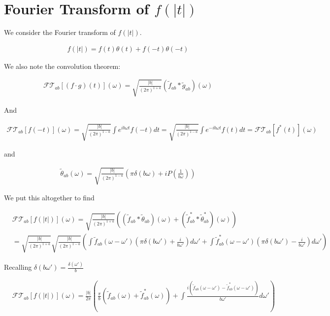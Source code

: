 \documentclass[12pt]{article}
\begin{document}
\section{Fourier Transform of $f(|t|)$}

We consider the Fourier transform of $f(|t|)$.

\begin{align}
f(|t|) = f(t)\theta(t) + f(-t)\theta(-t)
\end{align}

We also note the convolution theorem:

\begin{align}
\mathcal{FT}_{ab}[(f\cdot g)(t)](\omega) = \sqrt{\frac{|b|}{(2\pi)^{1+a}}} (\tilde{f}_{ab} \ast \tilde{g}_{ab})(\omega)
\end{align}

And

\begin{align}
\mathcal{FT}_{ab}[f(-t)](\omega) = \sqrt{\frac{|b|}{(2\pi)^{1-a}}}\int e^{i b \omega t}f(-t) dt = \sqrt{\frac{|b|}{(2\pi)^{1-a}}}\int e^{-i b \omega t}f(t) dt = \mathcal{FT}_{ab}[f^*(t)](\omega)
\end{align}

and

\begin{align}
\tilde{\theta}_{ab}(\omega) = \sqrt{\frac{|b|}{(2\pi)^{1-a}}} \left(\pi \delta(b\omega) + iP\left(\frac{1}{b\omega}\right)\right)
\end{align}

We put this altogether to find

\begin{align}
&\mathcal{FT}_{ab}[f(|t|)](\omega) = \sqrt{\frac{|b|}{(2\pi)^{1+a}}} \left((\tilde{f}_{ab} \ast \tilde{\theta}_{ab})(\omega)+(\tilde{f}^*_{ab} \ast \tilde{\theta}^*_{ab})(\omega)\right)\\
&=\sqrt{\frac{|b|}{(2\pi)^{1+a}}} \sqrt{\frac{|b|}{(2\pi)^{1-a}}}\left(\int \tilde{f}_{ab}(\omega-\omega')\left(\pi \delta(b\omega')+\frac{i}{b\omega'}\right)d\omega' + \int \tilde{f}^*_{ab}(\omega-\omega')\left(\pi \delta(b\omega')-\frac{i}{b\omega'}\right)d\omega'\right)
\end{align}

Recalling $\delta(b\omega') = \frac{\delta(\omega')}{b}$

\begin{align}
&\mathcal{FT}_{ab}[f(|t|)](\omega) = \frac{|b|}{2\pi}\left(\frac{\pi}{b}(\tilde{f}_{ab}(\omega)+\tilde{f}_{ab}^*(\omega)) + \int \frac{i \left(\tilde{f}_{ab}(\omega-\omega')-\tilde{f}_{ab}^*(\omega-\omega')\right)}{b\omega'} d\omega'\right)
\end{align}
\end{document}
